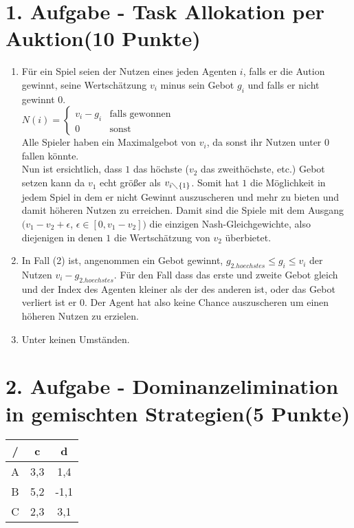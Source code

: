 \documentclass[a4paper, 11pt]{article}
\newcommand{\RM}[1]{\MakeUppercase{\romannumeral #1}}
\begin{document}
\section*{1. Aufgabe - Task Allokation per Auktion\hfill {\small (10 Punkte)}}
\begin{enumerate}
\item 
Für ein Spiel seien der Nutzen eines jeden Agenten $i$, falls er die Aution gewinnt, seine Wertschätzung $v_i$ minus sein Gebot $g_i$ und falls er nicht gewinnt 0.\\
$N(i) = \begin{cases}v_i - g_i&\text{falls gewonnen}\\0&\text{sonst}\end{cases} $ \\
Alle Spieler haben ein Maximalgebot von $v_i$, da sonst ihr Nutzen unter $0$ fallen könnte.\\
Nun ist ersichtlich, dass $1$ das höchste ($v_2$ das zweithöchste, etc.) Gebot setzen kann da $v_1$ echt größer als $v_{i	
\diagdown
\{1\}}$. Somit hat $1$ die Möglichkeit in jedem Spiel in dem er nicht Gewinnt auszuscheren und mehr zu bieten und damit höheren Nutzen zu erreichen.
Damit sind die Spiele mit dem Ausgang $(v_1 - v_2 + \epsilon$, $\epsilon \in [0,v_1-v_2])$ die einzigen Nash-Gleichgewichte, also diejenigen in denen $1$ die Wertschätzung von $v_2$ überbietet.

\item 
In Fall (2) ist, angenommen ein Gebot gewinnt, $g_{2.hoechstes} \leq g_i \leq v_i$ der Nutzen $v_i - g_{2.hoechstes}$. Für den Fall dass das erste und zweite Gebot gleich und der Index des Agenten kleiner als der des anderen ist, oder das Gebot verliert ist er 0. Der Agent hat also keine Chance auszuscheren um einen höheren Nutzen zu erzielen.
\item 
Unter keinen Umständen.
\end{enumerate}
\section*{2. Aufgabe - Dominanzelimination in gemischten Strategien\hfill {\small (5 Punkte)}}

\begin{center}
\begin{tabular}{c | cc}
	\RM{1}/\RM{2} & c & d \\ \hline
	A & 3,3 & 1,4\\
	B & 5,2 & -1,1\\
	C & 2,3 & 3,1\\
\end{tabular}
\end{center}
\end{document}
